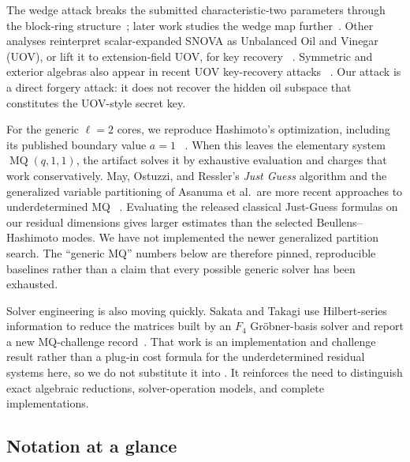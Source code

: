 \documentclass[11pt]{article}
\newcommand{\SNOVA}{\textsf{SNOVA}}
\begin{document}
The wedge attack breaks the submitted characteristic-two parameters through
the block-ring structure~\cite{BrosEtAl2026SNOVAWedge}; later work studies the
wedge map further~\cite{TsengEtAl2026Wedge}.  Other analyses reinterpret
scalar-expanded \SNOVA{} as Unbalanced Oil and Vinegar (UOV), or lift it to
extension-field UOV, for key recovery~%
\cite{IkematsuAkiyama2024,LiDing2024,NakamuraEtAl2025}.  Symmetric and
exterior algebras also appear in recent UOV key-recovery attacks~%
\cite{JinEtAl2026,Ran2026}.  Our attack is a direct forgery attack: it does not
recover the hidden oil subspace that constitutes the UOV-style secret key.

For the generic $\ell=2$ cores, we reproduce Hashimoto's optimization,
including its published boundary value $a=1$~%
\cite{Hashimoto2023,Beullens2024SNOVA}.  When this leaves the elementary system
$\operatorname{MQ}(q,1,1)$, the artifact solves it by exhaustive evaluation and
charges that work conservatively.  May, Ostuzzi, and Ressler's \emph{Just
Guess} algorithm and the generalized variable partitioning of Asanuma et al.\ are more recent approaches to underdetermined MQ~%
\cite{MayOstuzziRessler2026,AsanumaEtAl2026}.  Evaluating the released
classical Just-Guess formulas on our residual dimensions gives larger estimates
than the selected Beullens--Hashimoto modes.  We have not implemented the newer
generalized partition search.  The ``generic MQ'' numbers below are therefore
pinned, reproducible baselines rather than a claim that every possible generic
solver has been exhausted.

Solver engineering is also moving quickly.  Sakata and Takagi use
Hilbert-series information to reduce the matrices built by an $F_4$
Gr\"obner-basis solver and report a new MQ-challenge
record~\cite{SakataTakagi2026}.  That work is an
implementation and challenge result rather than a plug-in cost formula for the
underdetermined residual systems here, so we do not substitute it into
.  It reinforces the need to distinguish exact algebraic
reductions, solver-operation models, and complete implementations.


\subsection{Notation at a glance}\label{sec:notation}
\end{document}
